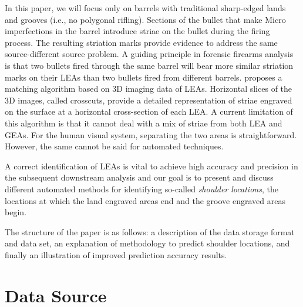 \documentclass[12pt]{article}
\begin{document}
In this paper, we will focus only on barrels with traditional
sharp-edged lands and grooves (i.e., no polygonal rifling). Sections of
the bullet that make
{\color{teal}{contact with high points inside the barrel are called land engraved areas (LEAs) and alternate with low points called groove engraved areas (GEAs).}}
Micro imperfections in the barrel introduce striae on the bullet during
the firing process. The resulting striation marks provide evidence to
address the same source-different source problem. A guiding principle in
forensic firearms analysis is that two bullets fired through the same
barrel will bear more similar striation marks on their LEAs than two
bullets fired from different barrels. \citet{Hare1} proposes a matching
algorithm based on 3D imaging data of LEAs. Horizontal slices of the 3D
images, called crosscuts, provide a detailed representation of striae
engraved on the surface at a horizontal cross-section of each LEA. A
current limitation of this algorithm is that it cannot deal with a mix
of striae from both LEA and GEAs. For the human visual system,
separating the two areas is straightforward. However, the same cannot be
said for automated {\color{teal}{computer toolmark comparison}}
techniques.

A correct identification of LEAs is vital to achieve high accuracy and
precision in the subsequent downstream analysis and our goal is to
present and discuss different automated methods for identifying
so-called \emph{shoulder locations}, the locations at which the land
engraved areas end and the groove engraved areas begin.

{}

The structure of the paper is as follows: a description of the data
storage format and data set, an explanation of methodology to predict
shoulder locations, and finally an illustration of improved prediction
accuracy results.

\section{Data Source}
\end{document}
